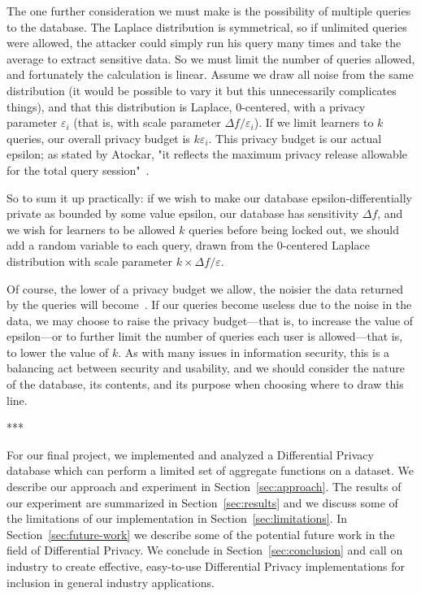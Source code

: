 \documentclass[conference,11pt]{IEEEtran}
\begin{document}
The one further consideration we must make is the possibility of multiple
queries to the database. The Laplace distribution is symmetrical, so if
unlimited queries were allowed, the attacker could simply run his query many
times and take the average to extract sensitive data. So we must limit the
number of queries allowed, and fortunately the calculation is linear. Assume we
draw all noise from the same distribution (it would be possible to vary it but
this unnecessarily complicates things), and that this distribution is Laplace,
0-centered, with a privacy parameter $\varepsilon_i$ (that is, with scale
parameter ${\Delta}f/\varepsilon_i$). If we limit learners to $k$ queries, our
overall privacy budget is $k\varepsilon_i$. This privacy budget is our
actual epsilon; as stated by Atockar, "it reflects the maximum privacy release
allowable for the total query session"~\cite{Atockar:2014}.

So to sum it up practically: if we wish to make our database
epsilon-differentially private as bounded by some value epsilon, our database
has sensitivity ${\Delta}f$, and we wish for learners to be allowed $k$ queries
before being locked out, we should add a random variable to each query, drawn
from the 0-centered Laplace distribution with scale parameter $k \times
{\Delta}f/\varepsilon$.

Of course, the lower of a privacy budget we allow, the noisier the data returned
by the queries will become~\cite{Atockar:2014}. If our queries become useless
due to the noise in the data, we may choose to raise the privacy budget---that
is, to increase the value of epsilon---or to further limit the number of queries
each user is allowed---that is, to lower the value of $k$. As with many issues
in information security, this is a balancing act between security and usability,
and we should consider the nature of the database, its contents, and its purpose
when choosing where to draw this line.

\begin{center}***\end{center}

For our final project, we implemented and analyzed a Differential Privacy
database which can perform a limited set of aggregate functions on a dataset.
We describe our approach and experiment in Section~\ref{sec:approach}. The
results of our experiment are summarized in Section~\ref{sec:results} and we
discuss some of the limitations of our implementation in
Section~\ref{sec:limitations}. In Section~\ref{sec:future-work} we describe some
of the potential future work in the field of Differential Privacy. We conclude
in Section~\ref{sec:conclusion} and call on industry to create effective,
easy-to-use Differential Privacy implementations for inclusion in general
industry applications.
\end{document}
